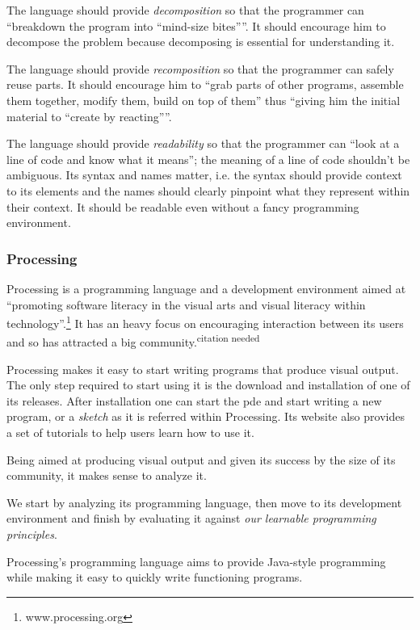 \documentclass{./llncs2e/llncs}
\begin{document}
The language should provide \emph{decomposition} so that the programmer can ``breakdown the program into ``mind-size bites''''. It should encourage him to decompose the problem because decomposing is essential for understanding it.

The language should provide \emph{recomposition} so that the programmer can safely reuse parts. It should encourage him to ``grab parts of other programs, assemble them together, modify them, build on top of them'' thus ``giving him the initial material to ``create by reacting''''.

The language should provide \emph{readability} so that the programmer can ``look at a line of code and know what it means''; the meaning of a line of code shouldn't be ambiguous. Its syntax and names matter, i.e. the syntax should provide context to its elements and the names should clearly pinpoint what they represent within their context. It should be readable even without a fancy programming environment.

\subsubsection{Processing\cite{reas2007processing}}
Processing is a programming language and a development environment aimed at ``promoting software literacy in the visual arts and visual literacy within technology''.\footnote{www.processing.org} It has an heavy focus on encouraging interaction between its users and so has attracted a big community.\textsuperscript{citation needed}

Processing makes it easy to start writing programs that produce visual output. The only step required to start using it is the download and installation of one of its releases. After installation one can start the \ac{pde} and start writing a new program, or a \emph{sketch} as it is referred within Processing. Its website also provides a set of tutorials to help users learn how to use it.

Being aimed at producing visual output and given its success by the size of its community, it makes sense to analyze it.

We start by analyzing its programming language, then move to its development environment and finish by evaluating it against \emph{our learnable programming principles}.

Processing's programming language aims to provide Java-style programming while making it easy to quickly write functioning programs. 
\end{document}
